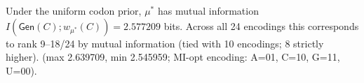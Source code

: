 Under the uniform codon prior, $\mu^\ast$ has mutual information $I(\mathsf{Gen}(C);w_{\mu^\ast}(C))=2.577209$ bits. Across all 24 encodings this corresponds to rank 9--18/24 by mutual information (tied with 10 encodings; 8 strictly higher). (max 2.639709, min 2.545959; MI-opt encoding: A=01, C=10, G=11, U=00).

